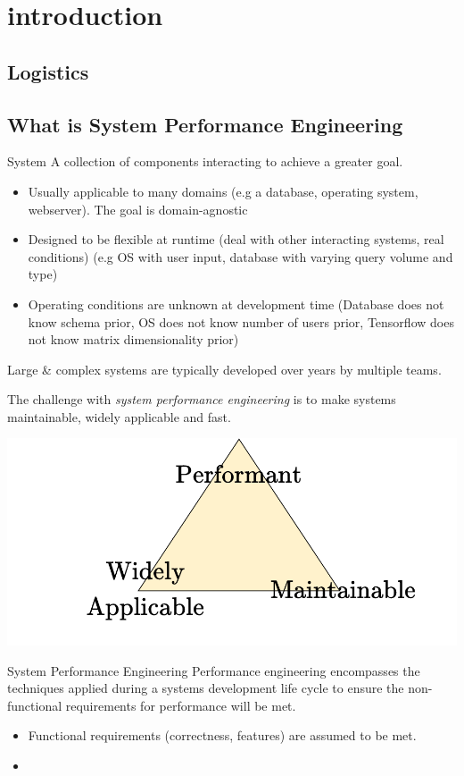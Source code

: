 \chapter{introduction}

\section{Logistics}



\section{What is System Performance Engineering}
\begin{definitionbox}{System}
    A collection of components interacting to achieve a greater goal.
    \begin{itemize}
        \item Usually applicable to many domains (e.g a database, operating system, webserver). The goal is domain-agnostic
        \item Designed to be flexible at runtime (deal with other interacting systems, real conditions) (e.g OS with user input, database with varying query volume and type)
        \item Operating conditions are unknown at development time (Database does not know schema prior, OS does not know number of users prior, Tensorflow does not know matrix dimensionality prior)
    \end{itemize}
    Large \& complex systems are typically developed over years by multiple teams.
\end{definitionbox}

The challenge with \textit{system performance engineering} is to make systems maintainable, widely applicable and fast.
\begin{center}
    \includegraphics[width=.6\textwidth]{introduction/images/holy_triangle.drawio}
\end{center} 

\begin{definitionbox}{System Performance Engineering}
    Performance engineering encompasses the techniques applied during a systems development life cycle to ensure the non-functional
    requirements for performance will be met.
    \begin{itemize}
        \item Functional requirements (correctness, features) are assumed to be met.
        \item 
    \end{itemize} 
\end{definitionbox}

